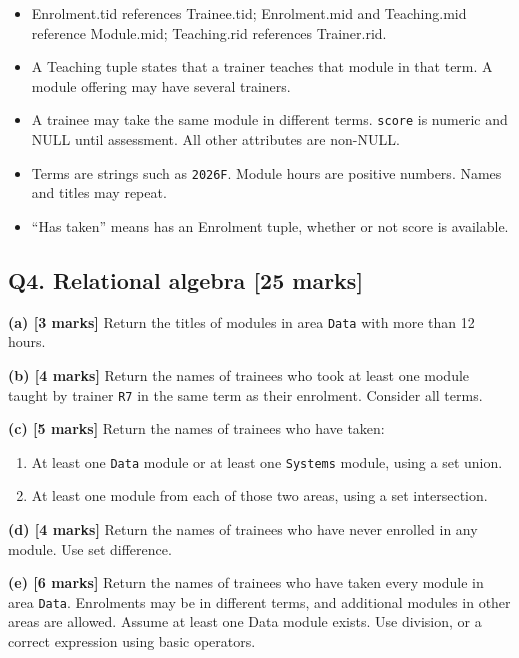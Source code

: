 \begin{itemize}
\tightlist
\item
  Enrolment.tid references Trainee.tid; Enrolment.mid and Teaching.mid reference Module.mid; Teaching.rid references Trainer.rid.
\item
  A Teaching tuple states that a trainer teaches that module in that term. A module offering may have several trainers.
\item
  A trainee may take the same module in different terms. \texttt{score} is numeric and NULL until assessment. All other attributes are non-NULL.
\item
  Terms are strings such as \texttt{\textquotesingle{}2026F\textquotesingle{}}. Module hours are positive numbers. Names and titles may repeat.
\item
  ``Has taken'' means has an Enrolment tuple, whether or not score is available.
\end{itemize}

\subsection{Q4. Relational algebra {[}25 marks{]}}\label{practice_paper_1-q4.-relational-algebra-25-marks}

\textbf{(a) {[}3 marks{]}} Return the titles of modules in area \texttt{\textquotesingle{}Data\textquotesingle{}} with more than 12 hours.

\textbf{(b) {[}4 marks{]}} Return the names of trainees who took at least one module taught by trainer \texttt{\textquotesingle{}R7\textquotesingle{}} in the same term as their enrolment. Consider all terms.

\textbf{(c) {[}5 marks{]}} Return the names of trainees who have taken:

\begin{enumerate}
\def\labelenumi{\arabic{enumi}.}
\tightlist
\item
  At least one \texttt{\textquotesingle{}Data\textquotesingle{}} module or at least one \texttt{\textquotesingle{}Systems\textquotesingle{}} module, using a set union.
\item
  At least one module from each of those two areas, using a set intersection.
\end{enumerate}

\textbf{(d) {[}4 marks{]}} Return the names of trainees who have never enrolled in any module. Use set difference.

\textbf{(e) {[}6 marks{]}} Return the names of trainees who have taken every module in area \texttt{\textquotesingle{}Data\textquotesingle{}}. Enrolments may be in different terms, and additional modules in other areas are allowed. Assume at least one Data module exists. Use division, or a correct expression using basic operators.

